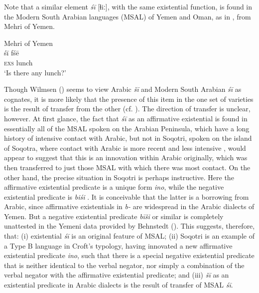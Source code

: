 \documentclass[output=paper]{langsci/langscibook}
\begin{document}
Note that a similar element \textit{śī} [ɬiː], with the same existential function, is found in the Modern South Arabian languages (MSAL) of Yemen and Oman, as in , from Mehri of Yemen.

\ea\label{ex:key:meh}
{       Mehri of Yemen \citep[31]{Watson2011SAYemeni}}\\
\gll śī fśē \\
     \textsc{exs} lunch\\
\glt ‘Is there any lunch?’
\z

Though Wilmsen (\citeyear[126]{Wilmsen2014}) seems to view Arabic \textit{šī} and Modern South Arabian \textit{śī} as cognates, it is more likely that the presence of this item in the one set of varieties is the result of transfer from the other (cf. \citealt{Al-Jallad2015review}). The direction of transfer is unclear, however. At first glance, the fact that \textit{śī} as an affirmative existential is found in essentially all of the MSAL spoken on the Arabian Peninsula, which have a long history of intensive contact with Arabic, but not in Soqotri, spoken on the island of Soqotra, where contact with Arabic is more recent and less intensive \citep{Simeone-Senelle2003}, would appear to suggest that this is an innovation within Arabic originally, which was then transferred to just those MSAL with which there was most contact. On the other hand, the precise situation in Soqotri is perhaps instructive. Here the affirmative existential predicate is a unique form \textit{ino}, while the negative existential predicate is \textit{biśi} \citep[1108]{Simeone-Senelle2011}. It is conceivable that the latter is a borrowing from Arabic, since affirmative existentials in \textit{b-} are widespread in the Arabic dialects of Yemen. But a negative existential predicate \textit{bīši} or similar is completely unattested in the Yemeni data provided by Behnstedt (\citeyear[346–348]{Behnstedt2016Yemen}). This suggests, therefore, that: (i) existential \textit{śī} is an original feature of MSAL; (ii) Soqotri is an example of a Type B language in Croft’s typology, having innovated a new affirmative existential predicate \textit{ino}, such that there is a special negative existential predicate that is neither identical to the verbal negator, nor simply a combination of the verbal negator with the affirmative existential predicate; and (iii) \textit{šī} as an existential predicate in Arabic dialects is the result of transfer of MSAL \textit{śī}. 
\end{document}
